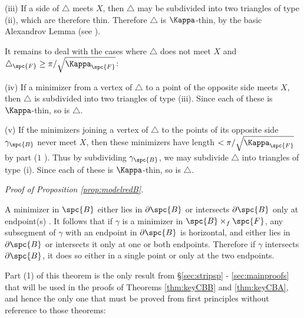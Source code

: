(iii) If a side of $\triangle$ meets $X$, then $\triangle$ may be
subdivided into two triangles of type (ii), which are
therefore thin.  Therefore $\triangle$ is $\Kappa$-thin, by the basic
Alexandrov Lemma (see \cite[p.115]{BBI}).

It remains to deal with the cases where $\triangle$ does not meet $X$ and
$\triangle_\spc{F} \ge \pi/\sqrt{\Kappa_\spc{F}}$:

(iv)  If a minimizer from a vertex of $\triangle$ to a point of
the opposite side meets $X$, then $\triangle$ is subdivided into
two triangles of type (iii). Since each of these is $\Kappa$-thin, so
is $\triangle$.

(v) If the minimizers joining a vertex of $\triangle$ to the
points of its opposite side $\gamma_\spc{B}$ never meet $X$, then these
minimizers have length $<\pi/\sqrt{\Kappa_\spc{F}}$ by part ($1$ ).  Thus by subdividing
$\gamma_\spc{B}$, we may subdivide $\triangle$ into triangles of type
(i). Since each of these is $\Kappa$-thin, so is $\triangle$. \qeds

\noindent\emph{Proof of Proposition \ref{prop:modelredB}.}

A minimizer in $\spc{B}$ either lies in $\partial \spc{B}$
or intersects $\partial \spc{B}$ only at endpoint(s) \cite{Pm}. It follows that if
$\gamma$ is a minimizer in $\spc{B}\times_f\spc{F}$, any subsegment of  $\gamma$
with an endpoint in $\partial \spc{B}$ is horizontal, and either lies in
$\partial \spc{B}$ or intersects it only at one or both endpoints.
Therefore if $\gamma$ intersects $\partial \spc{B}$, it does so either in a
single point or only at the two endpoints.


Part (1) of this theorem  is the only result
from \S \ref{sec:stripsp} - \ref{sec:mainproofs} that will be used in
the proofs of Theorems
\ref{thm:keyCBB} and \ref{thm:keyCBA}, and hence the only one that
must be proved from first principles without reference to those
theorems:


